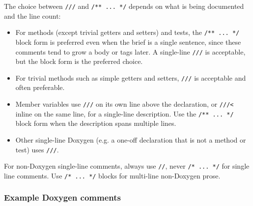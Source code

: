 The choice between \texttt{///} and \texttt{/** ... */} depends on what is being documented and the line count:
\begin{itemize}\itemsep0em
    \item For methods (except trivial getters and setters) and tests, the \texttt{/** ... */} block form is preferred even when the brief is a single sentence, since these comments tend to grow a body or tags later. A single-line \texttt{///} is acceptable, but the block form is the preferred choice.
    \item For trivial methods such as simple getters and setters, \texttt{///} is acceptable and often preferable.
    \item Member variables use \texttt{///} on its own line above the declaration, or \texttt{///<} inline on the same line, for a single-line description. Use the \texttt{/** ... */} block form when the description spans multiple lines.
    \item Other single-line Doxygen (e.g. a one-off declaration that is not a method or test) uses \texttt{///}.
\end{itemize}
For non-Doxygen single-line comments, always use \texttt{//}, never \texttt{/* ... */} for single line comments. Use \texttt{/* ... */} blocks for multi-line non-Doxygen prose.

\subsubsection*{Example Doxygen comments}

